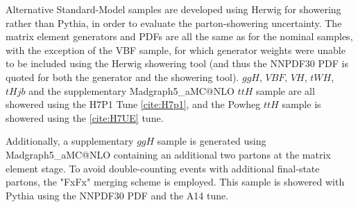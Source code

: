 Alternative Standard-Model samples are developed using Herwig for showering rather than Pythia, in order to evaluate the parton-showering uncertainty. The matrix element generators and PDFs are all the same as for the nominal samples, with the exception of the VBF sample, for which generator weights were unable to be included using the Herwig showering tool (and thus the NNPDF30 PDF is quoted for both the generator and the showering tool). $ggH$, $VBF$, $VH$, $tWH$, $tHjb$ and the supplementary Madgraph5_aMC@NLO $ttH$ sample are all showered using the H7P1 Tune \ref{cite:H7p1}, and the Powheg $ttH$ sample is showered using the \ref{cite:H7UE} tune.

Additionally, a supplementary $ggH$ sample is generated using Madgraph5_aMC@NLO containing an additional two partons at the matrix element stage. To avoid double-counting events with additional final-state partons, the "FxFx" merging scheme is employed. This sample is showered with Pythia using the NNPDF30 PDF and the A14 tune.
 
\begin{table}[h!]
  \centering
  \caption{Summary of alternative signal samples}
  \label{tab:signal_samples_herwig}
\end{table}  

